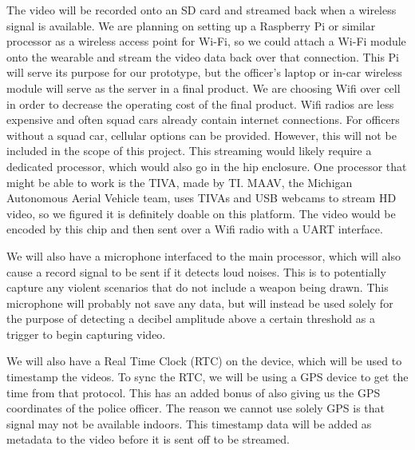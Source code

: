 \documentclass[12pt]{article}
\begin{document}
The video will be recorded onto an SD card and streamed back when a wireless
signal is available. We are planning on setting up a Raspberry Pi or similar
processor as a wireless access point for Wi-Fi, so we could attach a Wi-Fi
module onto the wearable and stream the video data back over that connection.
This Pi will serve its purpose for our prototype, but the officer's laptop or
in-car wireless module will serve as the server in a final product. We are
choosing Wifi over cell in order to decrease the operating cost of the final
product. Wifi radios are less expensive and often squad cars already contain
internet connections. For officers without a squad car, cellular options can be
provided. However, this will not be included in the scope of this project. This
streaming would likely require a dedicated processor, which would also go in
the hip enclosure. One processor that might be able to work is the TIVA, made
by TI. MAAV, the Michigan Autonomous Aerial Vehicle team, uses TIVAs and USB
webcams to stream HD video, so we figured it is definitely doable on this
platform. The video would be encoded by this chip and then sent over a Wifi
radio with a UART interface.

We will also have a microphone interfaced to the main processor, which will
also cause a record signal to be sent if it detects loud noises. This is to
potentially capture any violent scenarios that do not include a weapon being
drawn. This microphone will probably not save any data, but will instead be
used solely for the purpose of detecting a decibel amplitude above a certain
threshold as a trigger to begin capturing video.

We will also have a Real Time Clock (RTC) on the device, which will be used to
timestamp the videos. To sync the RTC, we will be using a GPS device to get the
time from that protocol. This has an added bonus of also giving us the GPS
coordinates of the police officer. The reason we cannot use solely GPS is that
signal may not be available indoors. This timestamp data will be added as
metadata to the video before it is sent off to be streamed. 
\end{document}
